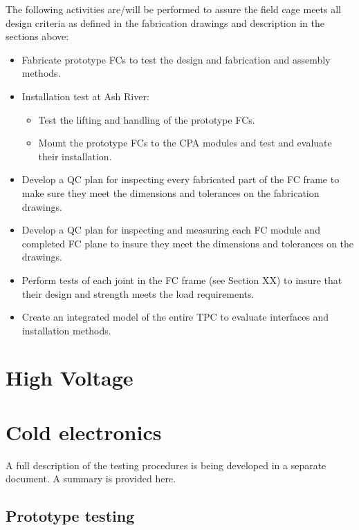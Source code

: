 The following activities are/will be performed to assure the field cage meets all design criteria as defined in the fabrication drawings and description in the sections above:
\begin{itemize}
\item	Fabricate prototype FCs to test the design and fabrication and assembly methods.
\item	Installation test at Ash River:
\begin{itemize}
\item	Test the lifting and handling of the prototype FCs.
\item	Mount the prototype FCs to the CPA modules and test and evaluate their installation.
\end{itemize}
\item	Develop a QC plan for inspecting every fabricated part of the FC frame to make sure they meet the dimensions and tolerances on the fabrication drawings.
\item	Develop a QC plan for inspecting and measuring each FC module and completed FC plane to insure they meet the dimensions and tolerances on the drawings.
\item	Perform tests of each joint in the FC frame (see Section XX) to insure that their design and strength meets the load requirements.
\item	Create an integrated model of the entire TPC to evaluate interfaces and installation methods.  
\end{itemize}

\section{High Voltage}


\section{Cold electronics}

A full description of the testing procedures is being developed in a separate document. A 
summary is provided here.

\subsection{Prototype testing}
\label{subsubsec:ce_install_proto}

